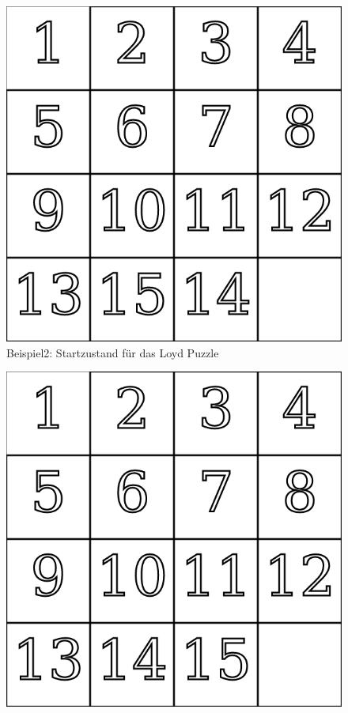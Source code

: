 \begin{minipage}{\linewidth}
	\begin{minipage}[t]{0.45\linewidth}
		\begin{figure}[H]
			\centering
			\includegraphics[width=\linewidth,keepaspectratio]{img/Ex2_start.png}
			\captionsetup{format=plain, indention=0pt}
			\caption{Beispiel2: Startzustand für das Loyd Puzzle \label{fig:Ex2_start}}
		\end{figure}
	\end{minipage}
	\hfill
	\begin{minipage}[t]{0.45\linewidth}
		\begin{figure}[H]
			\centering
			\includegraphics[width=\linewidth,keepaspectratio]{img/Ex2_end.png}

\end{figure}
\end{minipage}
\end{minipage}
